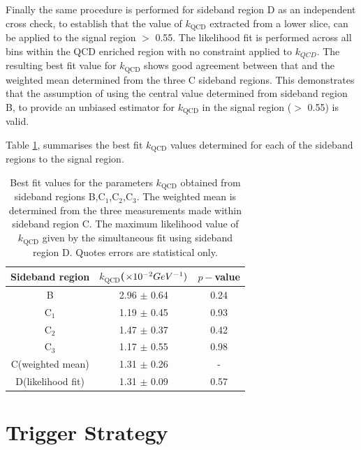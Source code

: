 Finally the same procedure is performed for sideband region D as an independent cross check, to establish that the value of $k_{\text{QCD}}$ extracted from a lower \alphat slice, can be applied to the signal region \alphat $>$ 0.55. The likelihood fit is performed across all \theht bins within the QCD enriched region with no constraint applied to $k_{QCD}$. The resulting best fit value for $k_{\text{QCD}}$ shows good agreement between that and the weighted mean determined from the three C sideband regions. This demonstrates that the assumption of using the central value determined from sideband region B, to provide an unbiased estimator for $k_{\text{QCD}}$ in the signal region (\alphat $>$ 0.55) is valid.

Table \ref{tab:kqcdresults}, summarises the best fit $k_{\text{QCD}}$ values determined for each of the sideband regions to the signal region.

\begin{table}[h!]
\footnotesize
\begin{center}
\begin{tabular*}{0.6\textwidth}{@{\extracolsep{\fill}}ccc}
\hline
Sideband region & $k_{\text{QCD}}$($\times 10^{-2} GeV^{-1})$ & $p-$value\\ 
\hline\hline
B & 2.96 $\pm$ 0.64 & 0.24 \\
C$_{1}$ & 1.19 $\pm$ 0.45 & 0.93 \\
C$_{2}$ & 1.47 $\pm$ 0.37 & 0.42 \\
C$_{3}$ & 1.17 $\pm$ 0.55 & 0.98 \\
\cline{1-3}
C(weighted mean) & 1.31 $\pm$ 0.26 & - \\
D(likelihood fit) & 1.31 $\pm$ 0.09 & 0.57 \\
\end{tabular*}
\end{center}
\caption[Best fit values for the parameters $k_{\text{QCD}}$ obtained from sideband regions B,C$_{1}$,C$_{2}$,C$_{3}$. ]{Best fit values for the parameters $k_{\text{QCD}}$ obtained from sideband regions B,C$_{1}$,C$_{2}$,C$_{3}$. The weighted mean is determined from the three measurements made within sideband region C. The maximum likelihood value of $k_{\text{QCD}}$ given by the simultaneous fit using sideband region D. Quotes errors are statistical only. }
\label{tab:kqcdresults}
\end{table}


\section{Trigger Strategy}
\label{subsec:triggerstrategy}

